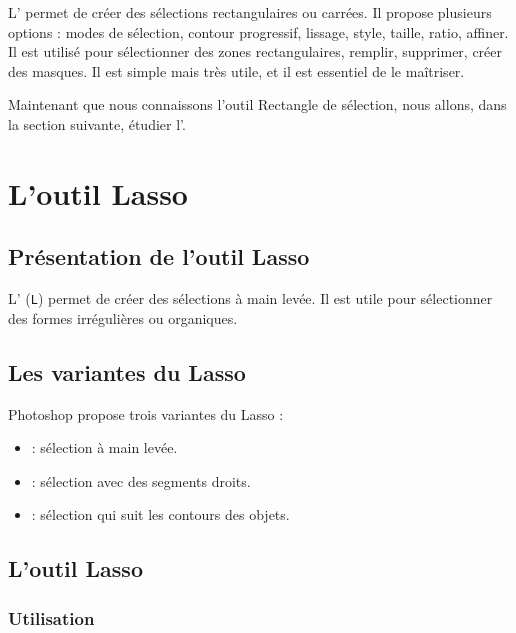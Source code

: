 L' permet de créer des sélections rectangulaires ou carrées. Il propose plusieurs options : modes de sélection, contour progressif, lissage, style, taille, ratio, affiner. Il est utilisé pour sélectionner des zones rectangulaires, remplir, supprimer, créer des masques. Il est simple mais très utile, et il est essentiel de le maîtriser.

Maintenant que nous connaissons l'outil Rectangle de sélection, nous allons, dans la section suivante, étudier l'.

\section{L'outil Lasso}

\subsection{Présentation de l'outil Lasso}

L' (\texttt{L}) permet de créer des sélections à main levée. Il est utile pour sélectionner des formes irrégulières ou organiques.

\subsection{Les variantes du Lasso}

Photoshop propose trois variantes du Lasso :

\begin{itemize}
    \item {} : sélection à main levée.
    \item {} : sélection avec des segments droits.
    \item {} : sélection qui suit les contours des objets.
\end{itemize}

\subsection{L'outil Lasso}

\subsubsection{Utilisation}

